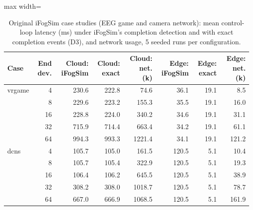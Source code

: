 \begin{table}[htbp]
\centering
\caption{Original iFogSim case studies (EEG game and camera network): mean control-loop latency (ms) under iFogSim's completion detection and with exact completion events (D3), and network usage, 5 seeded runs per configuration.}
\label{tab:gupta}
\begin{adjustbox}{max width=\textwidth}
\begin{tabular}{lrrrrrrr}
\toprule
Case & End dev. & Cloud: iFogSim & Cloud: exact & Cloud: net. (k) & Edge: iFogSim & Edge: exact & Edge: net. (k) \\
\midrule
vrgame & 4 & 230.6 & 222.8 & 74.6 & 36.1 & 19.1 & 8.5 \\
 & 8 & 229.6 & 223.2 & 155.3 & 35.5 & 19.1 & 16.0 \\
 & 16 & 228.8 & 224.0 & 340.2 & 34.6 & 19.1 & 31.1 \\
 & 32 & 715.9 & 714.4 & 663.4 & 34.2 & 19.1 & 61.1 \\
 & 64 & 994.3 & 993.3 & 1221.4 & 34.1 & 19.1 & 121.2 \\
dcns & 4 & 105.7 & 105.0 & 161.5 & 120.5 & 5.1 & 10.4 \\
 & 8 & 105.7 & 105.4 & 322.9 & 120.5 & 5.1 & 19.3 \\
 & 16 & 106.4 & 106.2 & 645.5 & 120.5 & 5.1 & 38.9 \\
 & 32 & 308.2 & 308.0 & 1018.7 & 120.5 & 5.1 & 78.7 \\
 & 64 & 667.0 & 666.9 & 1068.5 & 120.5 & 5.1 & 161.9 \\
\bottomrule
\end{tabular}
\end{adjustbox}
\end{table}

